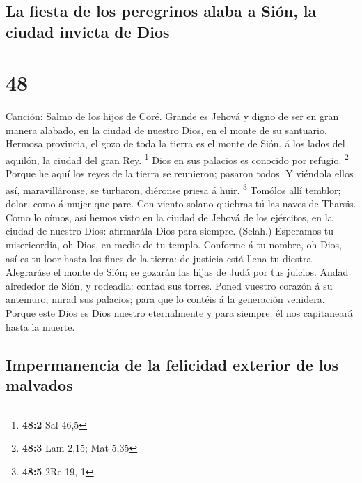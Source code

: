 \hypertarget{la-fiesta-de-los-peregrinos-alaba-a-siuxf3n-la-ciudad-invicta-de-dios}{%
\subsection{La fiesta de los peregrinos alaba a Sión, la ciudad invicta
de
Dios}\label{la-fiesta-de-los-peregrinos-alaba-a-siuxf3n-la-ciudad-invicta-de-dios}}

\hypertarget{section-47}{%
\section{48}\label{section-47}}

 Canción: Salmo de los hijos de Coré. Grande es Jehová y
digno de ser en gran manera alabado, en la ciudad de nuestro Dios, en el
monte de su santuario.  Hermosa provincia, el gozo de toda
la tierra es el monte de Sión, á los lados del aquilón, la ciudad del
gran Rey. \footnote{\textbf{48:2} Sal 46,5}  Dios en sus
palacios es conocido por refugio. \footnote{\textbf{48:3} Lam 2,15; Mat
  5,35}  Porque he aquí los reyes de la tierra se reunieron;
pasaron todos.  Y viéndola ellos así, maravilláronse, se
turbaron, diéronse priesa á huir. \footnote{\textbf{48:5} 2Re 19,-1}
 Tomólos allí temblor; dolor, como á mujer que pare.
 Con viento solano quiebras tú las naves de Tharsis.
 Como lo oímos, así hemos visto en la ciudad de Jehová de
los ejércitos, en la ciudad de nuestro Dios: afirmarála Dios para
siempre. (Selah.)  Esperamos tu misericordia, oh Dios, en
medio de tu templo.  Conforme á tu nombre, oh Dios, así es
tu loor hasta los fines de la tierra: de justicia está llena tu diestra.
 Alegraráse el monte de Sión; se gozarán las hijas de Judá
por tus juicios.  Andad alrededor de Sión, y rodeadla:
contad sus torres.  Poned vuestro corazón á su antemuro,
mirad sus palacios; para que lo contéis á la generación venidera.
 Porque este Dios es Dios nuestro eternalmente y para
siempre: él nos capitaneará hasta la muerte.

\hypertarget{impermanencia-de-la-felicidad-exterior-de-los-malvados}{%
\subsection{Impermanencia de la felicidad exterior de los
malvados}\label{impermanencia-de-la-felicidad-exterior-de-los-malvados}}

